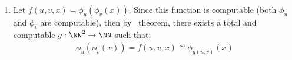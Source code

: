\begin{enumerate}[label=]
   \item 
   Let $f(u, v, x) = \phi_u(\phi_v(x))$. Since this function is computable (both $\phi_u$ and $\phi_v$ are computable), then by \smn\ theorem, there exists a total and computable $g: \NN^2 \to \NN$ such that:
   \begin{gather*}
      \phi_u(\phi_v(x)) = f(u, v, x) \cong \phi_{g(u, v)}(x)
   \end{gather*}
\end{enumerate}